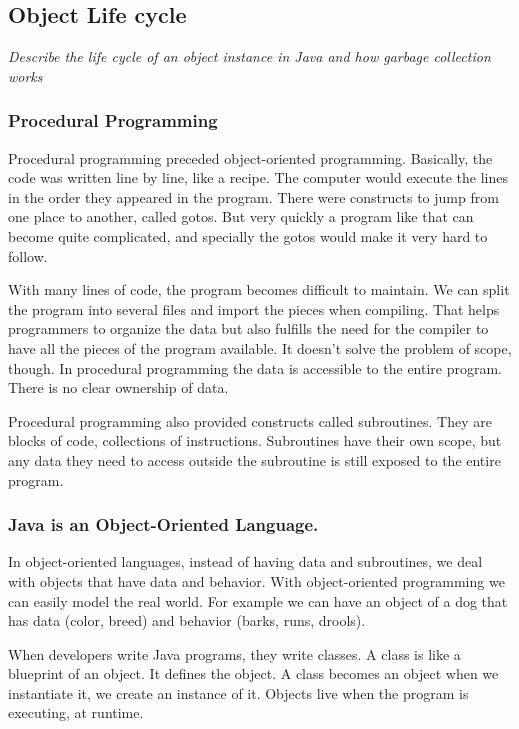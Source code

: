 \subsection{Object Life cycle}
\begin{center}\textit{Describe the life cycle of an object instance in Java and how garbage collection works}\end{center}

\subsubsection{Procedural Programming} 
Procedural programming preceded object-oriented programming. Basically, the code was written line by line, like a recipe. The computer would execute the lines in the order they appeared in the program. There were constructs to jump from one place to another, called gotos. But very quickly a program like that can become quite complicated, and specially the gotos would make it very hard to follow. 

With many lines of code, the program becomes difficult to maintain. We can split the program into several files and import the pieces when compiling. That helps programmers to organize the data but also fulfills the need for the compiler to have all the pieces of the program available. It doesn't solve the problem of scope, though. In procedural programming the data is accessible to the entire program. There is no clear ownership of data.

Procedural programming also provided constructs called subroutines. They are blocks of code, collections of instructions. Subroutines have their own scope, but any data they need to access outside the subroutine is still exposed to the entire program.

\subsubsection{Java is an Object-Oriented Language.} In object-oriented languages, instead of having data and subroutines, we deal with objects that have data and behavior. With object-oriented programming we can easily model the real world. For example we can have an object of a dog that has data (color, breed) and behavior (barks, runs, drools). 

When developers write Java programs, they write classes. A class is like a blueprint of an object. It defines the object. A class becomes an object when we instantiate it, we create an instance of it. Objects live when the program is executing, at runtime.

